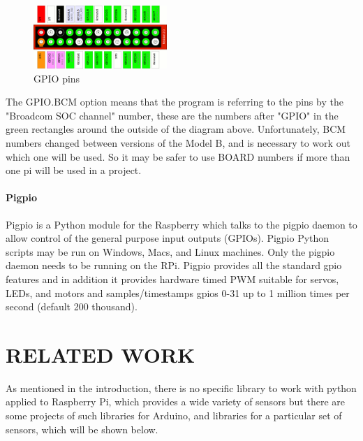 \documentclass{acm_proc_article-sp}
\begin{document}
\begin{figure}[h]
\centering
    \includegraphics[width=0.45\textwidth,natwidth=610,natheight=642]{pictures/ModelAB.png}
    \caption{GPIO pins \protect\cite{gpioHeader}}
    \label{fig:ModelAB}
\end{figure}

The GPIO.BCM option means that the program is referring to the pins by the "Broadcom SOC channel" number, these are the numbers after "GPIO" in the green rectangles around the outside of the diagram above.
\newline
\newline
Unfortunately, BCM numbers changed between versions of the Model B, and is necessary to work out which one will be used. So it may be safer to use BOARD numbers if more than one pi will be used in a project.

\paragraph{Pigpio}
Pigpio \cite{Pigpio} is a Python module for the Raspberry which talks to the pigpio daemon to allow control of the general purpose input outputs (GPIOs). Pigpio Python scripts may be run on Windows, Macs, and Linux machines. Only the pigpio daemon needs to be running on the RPi.
\newline
\newline
Pigpio provides all the standard gpio features and in addition it provides hardware timed PWM suitable for servos, LEDs, and motors and samples/timestamps gpios 0-31 up to 1 million times per second (default 200 thousand).


\section{RELATED WORK}
\label{sec:relatedWork}
As mentioned in the introduction, there is no specific library to work with python applied to Raspberry Pi, which provides a wide variety of sensors but there are some projects of such libraries for Arduino, and libraries for a particular set of sensors, which will be shown below.
\newline
\newline
\end{document}

